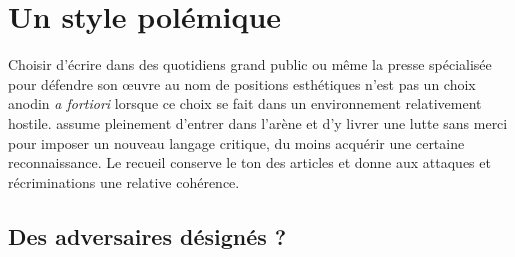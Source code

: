 \documentclass[12pt, a4paper]{article}
\begin{document}
	
%		
%		
%		
%		
	
	
	
	

\newpage

\section{Un style polémique}

Choisir d'écrire dans des quotidiens grand public ou même la presse spécialisée pour défendre son œuvre au nom de positions esthétiques n'est pas un choix anodin \textit{a fortiori} lorsque ce choix se fait dans un environnement relativement hostile. \robbe{} assume pleinement d'entrer dans l'arène et d'y livrer une lutte sans merci pour imposer un nouveau langage critique, du moins acquérir une certaine reconnaissance. Le recueil conserve le ton des articles et donne aux attaques et récriminations une relative cohérence.

\subsection{Des adversaires désignés ?}

\end{document}
